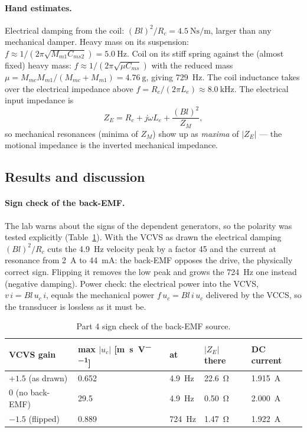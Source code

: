 \documentclass[a4paper,11pt]{article}
\newcommand{\jw}{j\omega}
\begin{document}
\paragraph{Hand estimates.} Electrical damping from the coil: $(Bl)^2/R_c = \SI{4.5}{\newton\second\per\metre}$,
larger than any mechanical damper. Heavy mass on its suspension: $f \approx 1/(2\pi\sqrt{M_{m1}C_{ms2}}) = \SI{5.0}{\hertz}$.
Coil on its stiff spring against the (almost fixed) heavy mass: $f \approx 1/(2\pi\sqrt{\mu C_{ms}})$ with the
reduced mass $\mu = M_{mc}M_{m1}/(M_{mc}+M_{m1}) = \SI{4.76}{\gram}$, giving \SI{729}{\hertz}. The coil inductance
takes over the electrical impedance above $f = R_c/(2\pi L_e) \approx \SI{8.0}{\kilo\hertz}$. The electrical
input impedance is
\[
Z_E = R_c + \jw L_e + \frac{(Bl)^2}{Z_M},
\]
so mechanical resonances (minima of $Z_M$) show up as \emph{maxima} of $|Z_E|$ --- the motional impedance is the
inverted mechanical impedance.


\subsection{Results and discussion}
\FloatBarrier
\paragraph{Sign check of the back-EMF.} The lab warns about the signs of the dependent generators, so the polarity was
tested explicitly (Table~\ref{tab:sign}). With the VCVS as drawn the electrical damping $(Bl)^2/R_c$ cuts the
\SI{4.9}{\hertz} velocity peak by a factor 45 and the current at resonance from \SI{2}{\ampere} to \SI{44}{\milli\ampere}:
the back-EMF opposes the drive, the physically correct sign. Flipping it removes the low peak and grows the
\SI{724}{\hertz} one instead (negative damping). Power check: the electrical power into the VCVS,
$v\,i = Bl\,u_c\,i$, equals the mechanical power $f\,u_c = Bl\,i\,u_c$ delivered by the VCCS, so the transducer is
lossless as it must be.
\begin{table}[H]\centering\small
\begin{tabular}{@{}lllll@{}}\toprule
VCVS gain & max $|u_c|$ [\si{\metre\per\second\per\volt}] & at & $|Z_E|$ there & DC current \\ \midrule
$+1.5$ (as drawn) & 0.652 & \SI{4.9}{\hertz} & \SI{22.6}{\ohm} & \SI{1.915}{\ampere} \\
0 (no back-EMF) & 29.5 & \SI{4.9}{\hertz} & \SI{0.50}{\ohm} & \SI{2.000}{\ampere} \\
$-1.5$ (flipped) & 0.889 & \SI{724}{\hertz} & \SI{1.47}{\ohm} & \SI{1.922}{\ampere} \\
\bottomrule\end{tabular}
\caption{Part 4 sign check of the back-EMF source.}\label{tab:sign}
\end{table}
\end{document}
